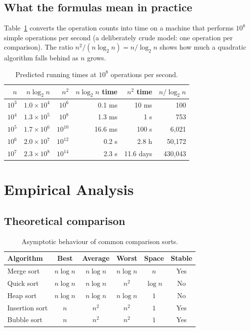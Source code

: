 \documentclass[11pt,a4paper]{article}
\theoremstyle{plain}
\theoremstyle{definition}
\renewcommand{\lg}{\log_2}
\begin{document}
\subsection{What the formulas mean in practice}
Table~\ref{tab:model} converts the operation counts into time on a machine that performs $10^8$ simple operations per second (a deliberately crude model: one operation per comparison). The ratio $n^2/(n\lg n)=n/\lg n$ shows how much a quadratic algorithm falls behind as $n$ grows.
\begin{table}[!ht]
\centering\small
\begin{tabular}{@{}rrrrrr@{}}
\toprule
$n$ & $n\lg n$ & $n^2$ & $n\lg n$ time & $n^2$ time & $n/\lg n$\\
\midrule
$10^3$ & $1.0\times10^4$ & $10^6$ & 0.1 ms & 10 ms & 100\\
$10^4$ & $1.3\times10^5$ & $10^8$ & 1.3 ms & 1 s & 753\\
$10^5$ & $1.7\times10^6$ & $10^{10}$ & 16.6 ms & 100 s & 6,021\\
$10^6$ & $2.0\times10^7$ & $10^{12}$ & 0.2 s & 2.8 h & 50,172\\
$10^7$ & $2.3\times10^8$ & $10^{14}$ & 2.3 s & 11.6 days & 430,043\\
\bottomrule
\end{tabular}
\caption{Predicted running times at $10^8$ operations per second.}
\label{tab:model}
\end{table}

\section{Empirical Analysis}\label{sec:empirical}
\subsection{Theoretical comparison}
\begin{table}[!ht]
\centering\small
\begin{tabular}{@{}lccccc@{}}
\toprule
Algorithm & Best & Average & Worst & Space & Stable\\
\midrule
Merge sort & $n\log n$ & $n\log n$ & $n\log n$ & $n$ & Yes\\
Quick sort & $n\log n$ & $n\log n$ & $n^2$ & $\log n$ & No\\
Heap sort & $n\log n$ & $n\log n$ & $n\log n$ & $1$ & No\\
Insertion sort & $n$ & $n^2$ & $n^2$ & $1$ & Yes\\
Bubble sort & $n$ & $n^2$ & $n^2$ & $1$ & Yes\\
\bottomrule
\end{tabular}
\caption{Asymptotic behaviour of common comparison sorts.}
\label{tab:cmp}
\end{table}
\end{document}
